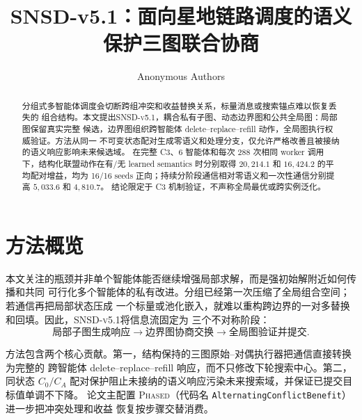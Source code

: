 \documentclass[sigconf,nonacm]{acmart}
\newcommand{\method}{\textsc{SNSD-v5.1}}
\newcommand{\phased}{\textsc{Phased}}
\begin{document}
\title{SNSD-v5.1：面向星地链路调度的语义保护三图联合协商}

\author{Anonymous Authors}

\begin{abstract}
分组式多智能体调度会切断跨组冲突和收益替换关系，标量消息或搜索锚点难以恢复丢失的
组合结构。本文提出\method，耦合私有子图、动态边界图和公共全局图：局部图保留真实完整
候选，边界图组织跨智能体 delete--replace--refill 动作，全局图执行权威验证。方法从同一
不可变状态配对生成零语义和处理分支，仅允许严格改善且被接纳的语义响应影响未来候选域。
在完整 C3、6 智能体和每次 288 次相同 worker 调用下，结构化联盟动作在有/无 learned
semantics 时分别取得 $20{,}214.1$ 和 $16{,}424.2$ 的平均配对增益，均为 16/16 seeds
正向；持续分阶段通信相对零语义和一次性通信分别提高 $5{,}033.6$ 和 $4{,}810.7$。
结论限定于 C3 机制验证，不声称全局最优或跨实例泛化。
\end{abstract}


\maketitle

\section{方法概览}

本文关注的瓶颈并非单个智能体能否继续增强局部求解，而是强初始解附近如何传播和共同
可行化多个智能体的私有改进。分组已经第一次压缩了全局组合空间；若通信再把局部状态压成
一个标量或池化嵌入，就难以重构跨边界的一对多替换和回填。因此，\method 将信息流固定为
三个不对称阶段：
\begin{equation}
\text{局部子图生成响应}
\rightarrow
\text{边界图协商交换}
\rightarrow
\text{全局图验证并提交}.
\end{equation}

方法包含两个核心贡献。第一，结构保持的三图原始--对偶执行器把通信直接转换为完整的
跨智能体 delete--replace--refill 响应，而不只修改下轮搜索中心。第二，同状态
$C_0/C_A$ 配对保护阻止未接纳的语义响应污染未来搜索域，并保证已提交目标值单调不下降。
论文主配置 \phased（代码名 \texttt{AlternatingConflictBenefit}）进一步把冲突处理和收益
恢复按步骤交替消费。



\end{document}
